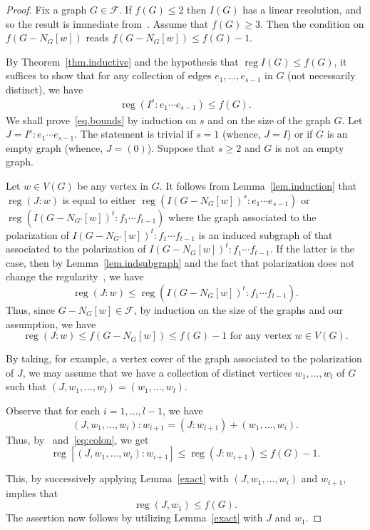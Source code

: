 \documentclass[ALCO,ThmDefs,Unicode,epreuves]{cedram}
\DeclareMathOperator{\reg}{reg}
\newcommand{\F}{\mathcal{F}}
\newcommand*{\reg}{\mathrm{reg}}
\begin{document}
\begin{proof} Fix a graph $G \in \F.$ If $f(G) \le 2$ then $I(G)$ has a linear resolution, and so the result is immediate from~\cite[Theorem 3.2]{HHZ}. Assume that $f(G) \ge 3$. Then the condition on $f(G - N_G[w])$ reads $f(G-N_G[w]) \le f(G)-1.$

By Theorem~\ref{thm.inductive} and the hypothesis that $\reg I(G) \le f(G)$, it suffices to show that for any collection of edges $e_1, \dots, e_{s-1}$ in $G$ (not necessarily distinct), we have
\begin{align}
\reg (I^s : e_1 \cdots e_{s-1}) \le f(G). \label{eq.bounds}
\end{align}
We shall prove~\eqref{eq.bounds} by induction on $s$ and on the size of the graph $G$. Let $J = I^s : e_1 \cdots e_{s-1}$. The statement is trivial if $s = 1$ (whence, $J = I$) or if $G$ is an empty graph (whence, $J = (0)$). Suppose that $s \ge 2$ and $G$ is not an empty graph.

Let $w \in V(G)$ be any vertex in $G$. It follows from Lemma~\ref{lem.induction} that $\reg (J:w)$ is equal to either $\reg (I(G - N_G[w])^s : e_1 \cdots e_{s-1})$ or $\reg (I(G - N_{G'}[w])^t : f_1 \cdots f_{t-1})$ where the graph associated to the polarization of $I(G-N_{G'}[w])^t : f_1 \cdots f_{t-1}$ is an induced subgraph of that associated to the polarization of $I(G-N_G[w])^t : f_1 \cdots f_{t-1}$. If the latter is the case, then by Lemma~\ref{lem.indsubgraph} and the fact that polarization does not change the regularity~\cite[Corollary 1.6.3]{HH}, we have 
\[
\reg (J:w) \le \reg (I(G-N_G[w])^t : f_1 \cdots f_{t-1}).
\]
Thus, since $G-N_G[w] \in \F$, by induction on the size of the graphs and our assumption, we have
\begin{equation}\label{eq:colon}
\reg (J:w) \le f(G-N_G[w]) \le f(G)-1 \text{ for any vertex } w \in V(G).
\end{equation}

By taking, for example, a vertex cover of the graph associated to the polarization of $J$, we may assume that we have a collection of distinct vertices $w_1, \dots, w_l$ of $G$ such that $(J,w_1, \dots, w_l) = (w_1, \dots, w_l)$.

Observe that for each $i = 1, \dots, l-1$, we have
\[
(J,w_1, \dots, w_i):w_{i+1} = (J:w_{i+1}) + (w_1, \dots, w_{i}).
\]
Thus, by~\cite[Corollary 3.2]{Herzog} and~\eqref{eq:colon}, we get
\[
\reg [(J,w_1, \dots, w_i):w_{i+1}] \le \reg (J:w_{i+1}) \le f(G)-1.
\]

This, by successively applying Lemma~\ref{exact} with $(J, w_1, \dots, w_i)$ and $w_{i+1}$, implies that
\[
\reg (J,w_1) \le f(G).
\]
The assertion now follows by utilizing Lemma~\ref{exact} with $J$ and $w_1$.
\end{proof}
\end{document}
